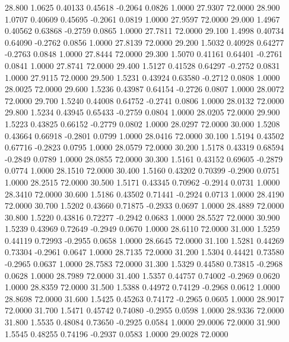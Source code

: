   28.800   1.0625   0.40133   0.45618  -0.2064   0.0826   1.0000  27.9307  72.0000
  28.900   1.0707   0.40609   0.45695  -0.2061   0.0819   1.0000  27.9597  72.0000
  29.000   1.4967   0.40562   0.63868  -0.2759   0.0865   1.0000  27.7811  72.0000
  29.100   1.4998   0.40734   0.64090  -0.2762   0.0856   1.0000  27.8139  72.0000
  29.200   1.5032   0.40928   0.64277  -0.2763   0.0848   1.0000  27.8444  72.0000
  29.300   1.5070   0.41161   0.64401  -0.2761   0.0841   1.0000  27.8741  72.0000
  29.400   1.5127   0.41528   0.64297  -0.2752   0.0831   1.0000  27.9115  72.0000
  29.500   1.5231   0.43924   0.63580  -0.2712   0.0808   1.0000  28.0025  72.0000
  29.600   1.5236   0.43987   0.64154  -0.2726   0.0807   1.0000  28.0072  72.0000
  29.700   1.5240   0.44008   0.64752  -0.2741   0.0806   1.0000  28.0132  72.0000
  29.800   1.5234   0.43945   0.65433  -0.2759   0.0804   1.0000  28.0205  72.0000
  29.900   1.5223   0.43825   0.66152  -0.2779   0.0802   1.0000  28.0297  72.0000
  30.000   1.5208   0.43664   0.66918  -0.2801   0.0799   1.0000  28.0416  72.0000
  30.100   1.5194   0.43502   0.67716  -0.2823   0.0795   1.0000  28.0579  72.0000
  30.200   1.5178   0.43319   0.68594  -0.2849   0.0789   1.0000  28.0855  72.0000
  30.300   1.5161   0.43152   0.69605  -0.2879   0.0774   1.0000  28.1510  72.0000
  30.400   1.5160   0.43202   0.70399  -0.2900   0.0751   1.0000  28.2515  72.0000
  30.500   1.5171   0.43345   0.70962  -0.2914   0.0731   1.0000  28.3410  72.0000
  30.600   1.5186   0.43502   0.71441  -0.2924   0.0713   1.0000  28.4190  72.0000
  30.700   1.5202   0.43660   0.71875  -0.2933   0.0697   1.0000  28.4889  72.0000
  30.800   1.5220   0.43816   0.72277  -0.2942   0.0683   1.0000  28.5527  72.0000
  30.900   1.5239   0.43969   0.72649  -0.2949   0.0670   1.0000  28.6110  72.0000
  31.000   1.5259   0.44119   0.72993  -0.2955   0.0658   1.0000  28.6645  72.0000
  31.100   1.5281   0.44269   0.73304  -0.2961   0.0647   1.0000  28.7135  72.0000
  31.200   1.5304   0.44421   0.73580  -0.2965   0.0637   1.0000  28.7583  72.0000
  31.300   1.5329   0.44580   0.73815  -0.2968   0.0628   1.0000  28.7989  72.0000
  31.400   1.5357   0.44757   0.74002  -0.2969   0.0620   1.0000  28.8359  72.0000
  31.500   1.5388   0.44972   0.74129  -0.2968   0.0612   1.0000  28.8698  72.0000
  31.600   1.5425   0.45263   0.74172  -0.2965   0.0605   1.0000  28.9017  72.0000
  31.700   1.5471   0.45742   0.74080  -0.2955   0.0598   1.0000  28.9336  72.0000
  31.800   1.5535   0.48084   0.73650  -0.2925   0.0584   1.0000  29.0006  72.0000
  31.900   1.5545   0.48255   0.74196  -0.2937   0.0583   1.0000  29.0028  72.0000
